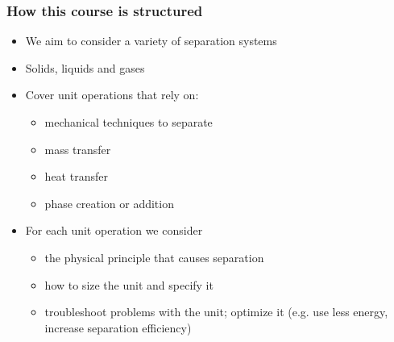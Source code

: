 
\begin{frame}\frametitle{How this course is structured}
	\begin{itemize}
		\item	We aim to consider a variety of separation systems
		\item	Solids, liquids and gases
		\item	Cover unit operations that rely on:
		\begin{itemize}
			\item	mechanical techniques to separate
			\item	mass transfer
			\item	heat transfer
			\item	phase creation or addition
		\end{itemize}
		\item	For each unit operation we consider
		\begin{itemize}
			\item	the physical principle that causes separation
			\item	how to size the unit and specify it
			\item	troubleshoot problems with the unit; optimize it (e.g. use less energy, increase separation efficiency)
			
		\end{itemize}
	\end{itemize}
\end{frame}

